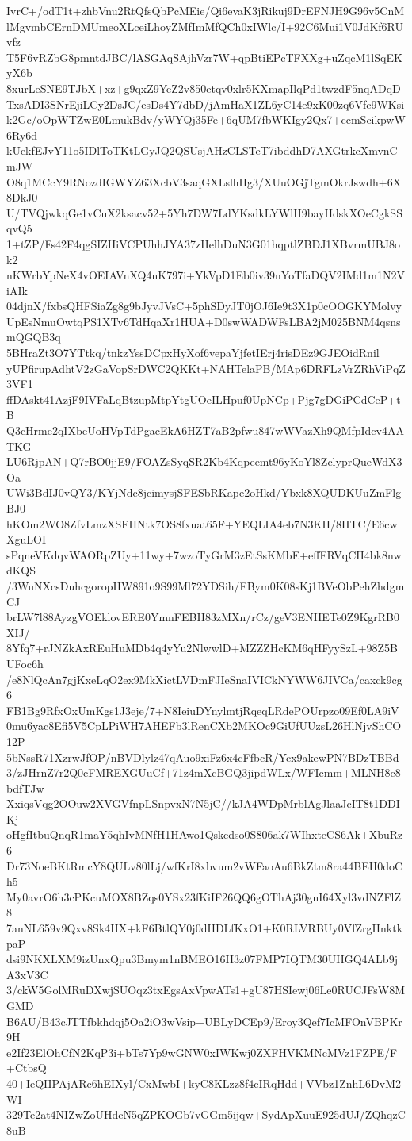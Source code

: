 IvrC+/odT1t+zhbVnu2RtQfsQbPcMEie/Qi6evaK3jRikuj9DrEFNJH9G96v5CnM
lMgvmbCErnDMUmeoXLceiLhoyZMfImMfQCh0xIWlc/I+92C6Mui1V0JdKf6RUvfz
T5F6vRZbG8pmntdJBC/lASGAqSAjhVzr7W+qpBtiEPcTFXXg+uZqcM1lSqEKyX6b
8xurLeSNE9TJbX+xz+g9qxZ9YeZ2v850etqv0xlr5KXmapIlqPd1twzdF5nqADqD
TxsADI3SNrEjiLCy2DsJC/esDs4Y7dbD/jAmHaX1ZL6yC14e9xK00zq6Vfc9WKsi
k2Gc/oOpWTZwE0LmukBdv/yWYQj35Fe+6qUM7fbWKIgy2Qx7+ccmScikpwW6Ry6d
kUekfEJvY11o5IDlToTKtLGyJQ2QSUsjAHzCLSTeT7ibddhD7AXGtrkcXmvnCmJW
O8q1MCcY9RNozdIGWYZ63XcbV3saqGXLslhHg3/XUuOGjTgmOkrJswdh+6X8DkJ0
U/TVQjwkqGe1vCuX2ksacv52+5Yh7DW7LdYKsdkLYWlH9bayHdskXOeCgkSSqvQ5
1+tZP/Fs42F4qgSIZHiVCPUhhJYA37zHelhDuN3G01hqptlZBDJ1XBvrmUBJ8ok2
nKWrbYpNeX4vOEIAVnXQ4nK797i+YkVpD1Eb0iv39nYoTfaDQV2IMd1m1N2ViAIk
04djnX/fxbsQHFSiaZg8g9bJyvJVsC+5phSDyJT0jOJ6Ie9t3X1p0cOOGKYMolvy
UpEsNmuOwtqPS1XTv6TdHqaXr1HUA+D0swWADWFsLBA2jM025BNM4qsnsmQGQB3q
5BHraZt3O7YTtkq/tnkzYssDCpxHyXof6vepaYjfetIErj4risDEz9GJEOidRnil
yUPfirupAdhtV2zGaVopSrDWC2QKKt+NAHTelaPB/MAp6DRFLzVrZRhViPqZ3VF1
ffDAskt41AzjF9IVFaLqBtzupMtpYtgUOeILHpuf0UpNCp+Pjg7gDGiPCdCeP+tB
Q3cHrme2qIXbeUoHVpTdPgacEkA6HZT7aB2pfwu847wWVazXh9QMfpIdcv4AATKG
LU6RjpAN+Q7rBO0jjE9/FOAZsSyqSR2Kb4Kqpeemt96yKoYl8ZclyprQueWdX3Oa
UWi3BdIJ0vQY3/KYjNdc8jcimysjSFESbRKape2oHkd/Ybxk8XQUDKUuZmFlgBJ0
hKOm2WO8ZfvLmzXSFHNtk7OS8fxuat65F+YEQLIA4eb7N3KH/8HTC/E6cwXguLOI
sPqneVKdqvWAORpZUy+11wy+7wzoTyGrM3zEtSsKMbE+effFRVqCII4bk8nwdKQS
/3WuNXcsDuhcgoropHW891o9S99Ml72YDSih/FBym0K08sKj1BVeObPehZhdgmCJ
brLW7l88AyzgVOEklovERE0YmnFEBH83zMXn/rCz/geV3ENHETe0Z9KgrRB0XIJ/
8Yfq7+rJNZkAxREuHuMDb4q4yYu2NlwwlD+MZZZHcKM6qHFyySzL+98Z5BUFoc6h
/e8NlQcAn7gjKxeLqO2ex9MkXictLVDmFJIeSnaIVICkNYWW6JIVCa/caxck9cg6
FB1Bg9RfxOxUmKgs1J3eje/7+N8IeiuDYnylmtjRqeqLRdePOUrpzo09Ef0LA9iV
0mu6yac8Efi5V5CpLPiWH7AHEFb3lRenCXb2MKOc9GiUfUUzsL26HlNjvShCO12P
5bNssR71XzrwJfOP/nBVDlylz47qAuo9xiFz6x4cFfbcR/Ycx9akewPN7BDzTBBd
3/zJHrnZ7r2Q0cFMREXGUuCf+71z4mXcBGQ3jipdWLx/WFIcmm+MLNH8c8bdfTJw
XxiqsVqg2OOuw2XVGVfnpLSnpvxN7N5jC//kJA4WDpMrblAgJlaaJcIT8t1DDIKj
oHgfItbuQnqR1maY5qhIvMNfH1HAwo1Qskcdso0S806ak7WIhxteCS6Ak+XbuRz6
Dr73NoeBKtRmcY8QULv80lLj/wfKrI8xbvum2vWFaoAu6BkZtm8ra44BEH0doCh5
My0avrO6h3cPKcuMOX8BZqs0YSx23fKiIF26QQ6gOThAj30gnI64Xyl3vdNZFlZ8
7anNL659v9Qxv8Sk4HX+kF6BtlQY0j0dHDLfKxO1+K0RLVRBUy0VfZrgHnktkpaP
dsi9NKXLXM9izUnxQpu3Bmym1nBMEO16II3z07FMP7IQTM30UHGQ4ALb9jA3xV3C
3/ckW5GolMRuDXwjSUOqz3txEgsAxVpwATs1+gU87HSIewj06Le0RUCJFsW8MGMD
B6AU/B43cJTTfbkhdqj5Oa2iO3wVsip+UBLyDCEp9/Eroy3Qef7IcMFOnVBPKr9H
e2If23ElOhCfN2KqP3i+bTs7Yp9wGNW0xIWKwj0ZXFHVKMNcMVz1FZPE/F+CtbsQ
40+IeQIIPAjARc6hEIXyl/CxMwbI+kyC8KLzz8f4cIRqHdd+VVbz1ZnhL6DvM2WI
329Te2at4NIZwZoUHdcN5qZPKOGb7vGGm5ijqw+SydApXuuE925dUJ/ZQhqzC8uB
